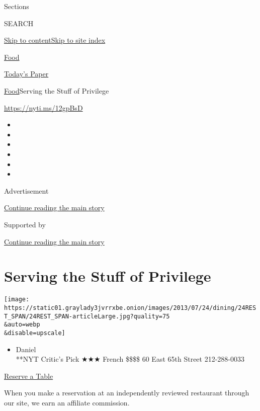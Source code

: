 Sections

SEARCH

\protect\hyperlink{site-content}{Skip to
content}\protect\hyperlink{site-index}{Skip to site index}

\href{https://www.nytimes3xbfgragh.onion/section/food}{Food}

\href{https://myaccount.nytimes3xbfgragh.onion/auth/login?response_type=cookie\&client_id=vi}{}

\href{https://www.nytimes3xbfgragh.onion/section/todayspaper}{Today's
Paper}

\href{/section/food}{Food}\textbar{}Serving the Stuff of Privilege

\url{https://nyti.ms/12gpBsD}

\begin{itemize}
\item
\item
\item
\item
\item
\item
\end{itemize}

Advertisement

\protect\hyperlink{after-top}{Continue reading the main story}

Supported by

\protect\hyperlink{after-sponsor}{Continue reading the main story}

\hypertarget{serving-the-stuff-of-privilege}{%
\section{Serving the Stuff of
Privilege}\label{serving-the-stuff-of-privilege}}

\texttt{[image: https://static01.graylady3jvrrxbe.onion/images/2013/07/24/dining/24REST\_SPAN/24REST\_SPAN-articleLarge.jpg?quality=75\\\&auto=webp\\\&disable=upscale]}

\begin{itemize}
\tightlist
\item
  Daniel\\
  **NYT Critic's Pick ★★★ French \$\$\$\$ 60 East 65th Street
  212-288-0033
\end{itemize}

\href{http://www.opentable.com/single.aspx?ref=4201\&rid=337}{Reserve a
Table}

When you make a reservation at an independently reviewed restaurant
through our site, we earn an affiliate commission.

